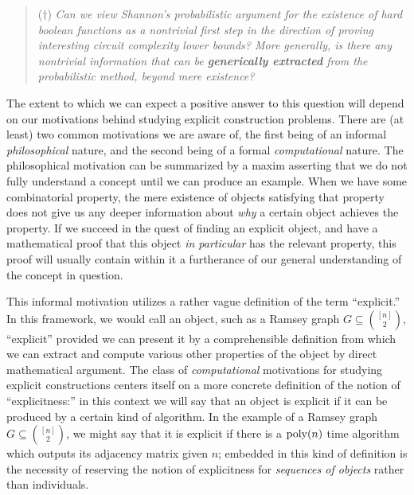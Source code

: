 \begin{quote}
($\dagger$) \textit{Can we view Shannon's probabilistic argument for the existence of hard boolean functions as a nontrivial first step in the direction of proving interesting circuit complexity lower bounds? More generally, is there any nontrivial information that can be \textbf{generically extracted} from the probabilistic method, beyond mere existence?}
\end{quote}

The extent to which we can expect a positive answer to this question will depend on our motivations behind studying explicit construction problems. There are (at least) two common motivations we are aware of, the first being of an informal \emph{philosophical} nature, and the second being of a formal \emph{computational} nature. The philosophical motivation can be summarized by a maxim asserting that we do not fully understand a concept until we can produce an example. When we have some combinatorial property, the mere existence of objects satisfying that property does not give us any deeper information about \emph{why} a certain object achieves the property. If we succeed in the quest of finding an explicit object, and have a mathematical proof that this object \emph{in particular} has the relevant property, this proof will usually contain within it a furtherance of our general understanding of the concept in question.

This informal motivation utilizes a rather vague definition of the term ``explicit.'' In this framework, we would call an object, such as a Ramsey graph $G \subseteq \binom{[n]}{2}$, ``explicit'' provided we can present it by a comprehensible definition from which we can extract and compute various other properties of the object by direct mathematical argument. The class of \emph{computational} motivations for studying explicit constructions centers itself on a more concrete definition of the notion of ``explicitness:'' in this context we will say that an object is explicit if it can be produced by a certain kind of algorithm. In the example of a Ramsey graph $G \subseteq \binom{[n]}{2}$, we might say that it is explicit if there is a $\mathrm{poly}(n)$ time algorithm which outputs its adjacency matrix given $n$; embedded in this kind of definition is the necessity of reserving the notion of explicitness for \emph{sequences of objects} rather than individuals. 

